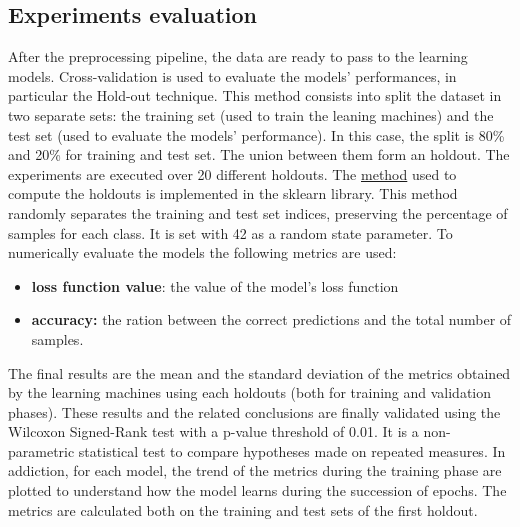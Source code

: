 \subsection{Experiments evaluation}\label{header-n82}

After the preprocessing pipeline, the data are ready to pass to the
learning models. Cross-validation is used to evaluate the models'
performances, in particular the Hold-out technique. This method consists
into split the dataset in two separate sets: the training set (used to
train the leaning machines) and the test set (used to evaluate the
models' performance). In this case, the split is 80\% and 20\% for
training and test set. The union between them form an holdout. The
experiments are executed over 20 different holdouts. The
\href{https://scikit-learn.org/stable/modules/generated/sklearn.model_selection.StratifiedShuffleSplit.html}{method}
used to compute the holdouts is implemented in the sklearn library. This
method randomly separates the training and test set indices, preserving
the percentage of samples for each class. It is set with 42 as a random
state parameter. To numerically evaluate the models the following
metrics are used:

\begin{itemize}
\item
  \textbf{loss function value}: the value of the model's loss function
\item
  \textbf{accuracy:} the ration between the correct predictions and the
  total number of samples.
\end{itemize}

The final results are the mean and the standard deviation of the metrics
obtained by the learning machines using each holdouts (both for training
and validation phases). These results and the related conclusions are
finally validated using the Wilcoxon Signed-Rank test with a p-value
threshold of 0.01. It is a non-parametric statistical test to compare
hypotheses made on repeated measures. In addiction, for each model, the
trend of the metrics during the training phase are plotted to understand
how the model learns during the succession of epochs. The metrics are
calculated both on the training and test sets of the first holdout.